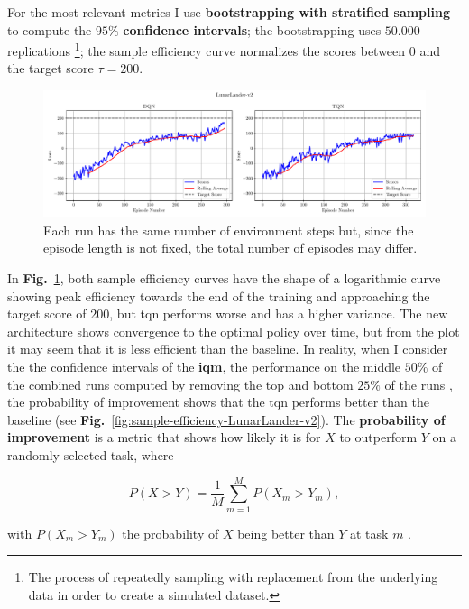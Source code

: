 For the most relevant metrics I use \textbf{bootstrapping with stratified sampling} to compute the $95\%$ \textbf{confidence intervals}; the bootstrapping uses $50.000$ replications \footnote{The process of repeatedly sampling with replacement from the underlying data in order to create a simulated dataset.}; the sample efficiency curve normalizes the scores between $0$ and the target score $\tau = 200$.

\begin{figure}[!htbp]
\centering
\includegraphics[width=\textwidth]{images/score-vs-episode_DQN-TQN_LunarLander-v2.pdf}
\caption{Each run has the same number of environment steps but, since the episode length is not fixed, the total number of episodes may differ.}
\label{fig:score-vs-episode-LunarLander-v2}
\end{figure}

In \textbf{Fig.}~\ref{fig:score-vs-episode-LunarLander-v2}, both sample efficiency curves have the shape of a logarithmic curve showing peak efficiency towards the end of the training and approaching the target score of $200$, but \acrshort{tqn} performs worse and has a higher variance. The new architecture shows convergence to the optimal policy over time, but from the plot it may seem that it is less efficient than the baseline. In reality, when I consider the the confidence intervals of the \textbf{\acrfull{iqm}}, the performance on the middle $50\%$ of the combined runs computed by removing the top and bottom $25\%$ of the runs \cite{rliable}, the probability of improvement shows that the \acrshort{tqn} performs better than the baseline (see \textbf{Fig.}~\ref{fig:sample-efficiency-LunarLander-v2}). The \textbf{probability of improvement} is a metric that shows how likely it is for $X$ to outperform $Y$ on a randomly selected task, where 

\begin{equation}
P(X > Y) = \frac{1}{M} \sum^M_{m=1} P(X_m > Y_m),
\label{eq:probability_of_improvement}
\end{equation}

with $P(X_m > Y_m)$ the probability of $X$ being better than $Y$ at task $m$ \cite{rliable}.

